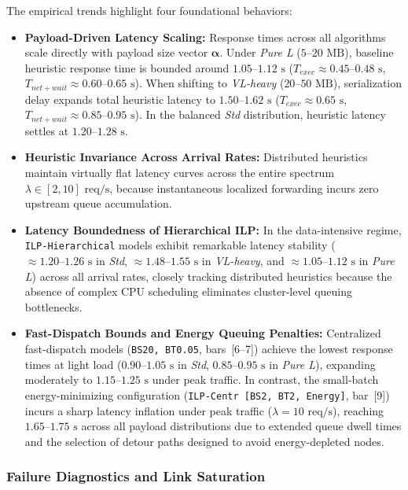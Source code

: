 The empirical trends highlight four foundational behaviors:
\begin{itemize}
    \item \textbf{Payload-Driven Latency Scaling:} Response times across all algorithms scale directly with payload size vector $\boldsymbol{\alpha}$. Under \textit{Pure L} ($5\text{--}20\text{ MB}$), baseline heuristic response time is bounded around $1.05\text{--}1.12\text{ s}$ ($T_{exec} \approx 0.45\text{--}0.48\text{ s}$, $T_{net+wait} \approx 0.60\text{--}0.65\text{ s}$). When shifting to \textit{VL-heavy} ($20\text{--}50\text{ MB}$), serialization delay expands total heuristic latency to $1.50\text{--}1.62\text{ s}$ ($T_{exec} \approx 0.65\text{ s}$, $T_{net+wait} \approx 0.85\text{--}0.95\text{ s}$). In the balanced \textit{Std} distribution, heuristic latency settles at $1.20\text{--}1.28\text{ s}$.
    \item \textbf{Heuristic Invariance Across Arrival Rates:} Distributed heuristics maintain virtually flat latency curves across the entire spectrum $\lambda \in [2, 10]\text{ req/s}$, because instantaneous localized forwarding incurs zero upstream queue accumulation.
    \item \textbf{Latency Boundedness of Hierarchical ILP:} In the data-intensive regime, \texttt{ILP-Hierarchical} models exhibit remarkable latency stability ($\approx 1.20\text{--}1.26\text{ s}$ in \textit{Std}, $\approx 1.48\text{--}1.55\text{ s}$ in \textit{VL-heavy}, and $\approx 1.05\text{--}1.12\text{ s}$ in \textit{Pure L}) across all arrival rates, closely tracking distributed heuristics because the absence of complex CPU scheduling eliminates cluster-level queuing bottlenecks.
    \item \textbf{Fast-Dispatch Bounds and Energy Queuing Penalties:} Centralized fast-dispatch models (\texttt{BS20, BT0.05}, bars~[6--7]) achieve the lowest response times at light load ($0.90\text{--}1.05\text{ s}$ in \textit{Std}, $0.85\text{--}0.95\text{ s}$ in \textit{Pure L}), expanding moderately to $1.15\text{--}1.25\text{ s}$ under peak traffic. In contrast, the small-batch energy-minimizing configuration (\texttt{ILP-Centr [BS2, BT2, Energy]}, bar~[9]) incurs a sharp latency inflation under peak traffic ($\lambda = 10\text{ req/s}$), reaching $1.65\text{--}1.75\text{ s}$ across all payload distributions due to extended queue dwell times and the selection of detour paths designed to avoid energy-depleted nodes.
\end{itemize}
\FloatBarrier
\subsubsection{Failure Diagnostics and Link Saturation}
\label{subsubsec:rej_data}


